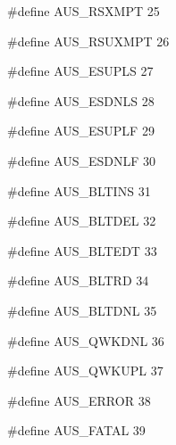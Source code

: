 \documentclass{article}
\begin{document}
\begin{cxxmacro}
{\#define}
        {AUS\_RSXMPT}
        {}
        {}
        {25}
\end{cxxmacro}
\begin{cxxmacro}
{\#define}
        {AUS\_RSUXMPT}
        {}
        {}
        {26}
\end{cxxmacro}
\begin{cxxmacro}
{\#define}
        {AUS\_ESUPLS}
        {}
        {}
        {27}
\end{cxxmacro}
\begin{cxxmacro}
{\#define}
        {AUS\_ESDNLS}
        {}
        {}
        {28}
\end{cxxmacro}
\begin{cxxmacro}
{\#define}
        {AUS\_ESUPLF}
        {}
        {}
        {29}
\end{cxxmacro}
\begin{cxxmacro}
{\#define}
        {AUS\_ESDNLF}
        {}
        {}
        {30}
\end{cxxmacro}
\begin{cxxmacro}
{\#define}
        {AUS\_BLTINS}
        {}
        {}
        {31}
\end{cxxmacro}
\begin{cxxmacro}
{\#define}
        {AUS\_BLTDEL}
        {}
        {}
        {32}
\end{cxxmacro}
\begin{cxxmacro}
{\#define}
        {AUS\_BLTEDT}
        {}
        {}
        {33}
\end{cxxmacro}
\begin{cxxmacro}
{\#define}
        {AUS\_BLTRD}
        {}
        {}
        {34}
\end{cxxmacro}
\begin{cxxmacro}
{\#define}
        {AUS\_BLTDNL}
        {}
        {}
        {35}
\end{cxxmacro}
\begin{cxxmacro}
{\#define}
        {AUS\_QWKDNL}
        {}
        {}
        {36}
\end{cxxmacro}
\begin{cxxmacro}
{\#define}
        {AUS\_QWKUPL}
        {}
        {}
        {37}
\end{cxxmacro}
\begin{cxxmacro}
{\#define}
        {AUS\_ERROR}
        {}
        {}
        {38}
\end{cxxmacro}
\begin{cxxmacro}
{\#define}
        {AUS\_FATAL}
        {}
        {}
        {39}
\end{cxxmacro}
\end{document}
